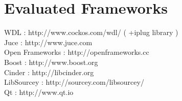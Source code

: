 \section{Evaluated Frameworks}

WDL : http://www.cockos.com/wdl/ ( +iplug library ) \\
Juce : http://www.juce.com \\
Open Frameworks : http://openframeworks.cc \\
Boost : http://www.boost.org \\
Cinder : http://libcinder.org \\
LibSourcey : http://sourcey.com/libsourcey/ \\
Qt : http://www.qt.io \\